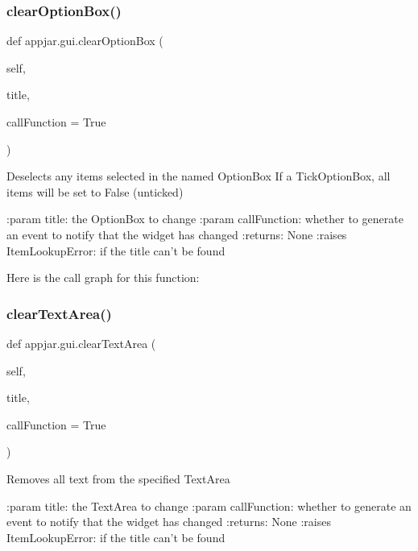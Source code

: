 \subsubsection{\texorpdfstring{clear\+Option\+Box()}{clearOptionBox()}}
{\footnotesize\ttfamily def appjar.\+gui.\+clear\+Option\+Box (\begin{DoxyParamCaption}\item[{}]{self,  }\item[{}]{title,  }\item[{}]{call\+Function = {\ttfamily True} }\end{DoxyParamCaption})}

\begin{DoxyVerb}Deselects any items selected in the named OptionBox
If a TickOptionBox, all items will be set to False (unticked)

:param title: the OptionBox to change
:param callFunction: whether to generate an event to notify that the widget has changed
:returns: None
:raises ItemLookupError: if the title can't be found
\end{DoxyVerb}
 Here is the call graph for this function\+:
\mbox{\label{classappjar_1_1gui_ada8714b878a9db8801766b9209c2fe21}} 
\subsubsection{\texorpdfstring{clear\+Text\+Area()}{clearTextArea()}}
{\footnotesize\ttfamily def appjar.\+gui.\+clear\+Text\+Area (\begin{DoxyParamCaption}\item[{}]{self,  }\item[{}]{title,  }\item[{}]{call\+Function = {\ttfamily True} }\end{DoxyParamCaption})}

\begin{DoxyVerb}Removes all text from the specified TextArea

:param title: the TextArea to change
:param callFunction: whether to generate an event to notify that the widget has changed
:returns: None
:raises ItemLookupError: if the title can't be found
\end{DoxyVerb}
 \mbox{\label{classappjar_1_1gui_a19e1a774acd534584ae45d26252bd6d8}} 
